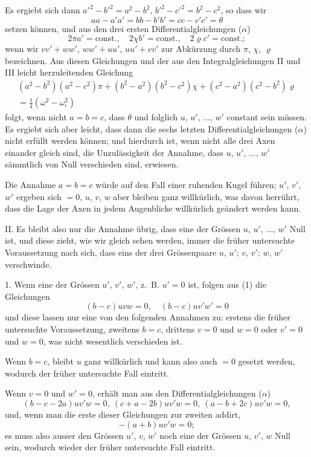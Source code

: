 \documentclass[12pt,a4paper]{article}
\begin{document}
Es ergiebt sich dann $a'^2 - b'^2 = a^2 - b^2$, $b'^2 - c'^2 = b^2 - c^2$, so dass wir
\[ aa - a'a' = bb - b'b' = cc - c'c' = \theta \]
setzen können, und aus den drei ersten Differentialgleichungen ($\alpha$)
\[ 2\pi a' = \text{const.},\quad 2\chi b' = \text{const.},\quad 2\varrho c' = \text{const.}; \]
wenn wir $vv' + ww'$, $ww' + uu'$, $uu' + vv'$ zur Abkürzung durch $\pi$, $\chi$, $\varrho$ bezeichnen. Aus diesen Gleichungen und der aus den Integralgleichungen II und III leicht herzuleitenden Gleichung
\begin{multline*}
(a^2-b^2)(a^2-c^2)\pi + (b^2-a^2)(b^2-c^2)\chi + (c^2-a^2)(c^2-b^2)\varrho\\
= \tfrac{1}{4}(\omega^2 - \omega_\iota^2)
\end{multline*}
folgt, wenn nicht $a = b = c$, dass $\theta$ und folglich $u$, $u'$, $\ldots$, $w'$ constant sein müssen. Es ergiebt sich aber leicht, dass dann die sechs letzten Differentialgleichungen ($\alpha$) nicht erfüllt werden können; und hierdurch ist, wenn nicht alle drei Axen einander gleich sind, die Unzulässigkeit der Annahme, dass $u$, $u'$, $\ldots$, $w'$ sämmtlich von Null verschieden sind, erwiesen.

Die Annahme $a = b = c$ würde auf den Fall einer ruhenden Kugel führen; $u'$, $v'$, $w'$ ergeben sich $= 0$, $u$, $v$, $w$ aber bleiben ganz willkürlich, was davon herrührt, dass die Lage der Axen in jedem Augenblicke willkürlich geändert werden kann.

II. Es bleibt also nur die Annahme übrig, dass eine der Grössen $u$, $u'$, $\ldots$, $w'$ Null ist, und diese zieht, wie wir gleich sehen werden, immer die früher untersuchte Voraussetzung nach sich, dass eins der drei Grössenpaare $u$, $u'$; $v$, $v'$; $w$, $w'$ verschwinde.

1. Wenn eine der Grössen $u'$, $v'$, $w'$, z.~B. $u' = 0$ ist, folgen aus (1) die Gleichungen
\[ (b-c)uvw = 0,\quad (b-c)uv'w' = 0 \]
und diese lassen nur eine von den folgenden Annahmen zu: erstens die früher untersuchte Voraussetzung, zweitens $b = c$, drittens $v = 0$ und $w = 0$ oder $v' = 0$ und $w = 0$, was nicht wesentlich verschieden ist.

Wenn $b = c$, bleibt $u$ ganz willkürlich und kann also auch $= 0$ gesetzt werden, wodurch der früher untersuchte Fall eintritt.

Wenn $v = 0$ und $w' = 0$, erhält man aus den Differentialgleichungen ($\alpha$)
\[ (b-c-2a)uv'w = 0,\ (c+a-2b)uv'w = 0,\ (a-b+2c)uv'w = 0, \]
und, wenn man die erste dieser Gleichungen zur zweiten addirt,
\[ -(a+b)uv'w = 0; \]
es muss also ausser den Grössen $u'$, $v$, $w'$ noch eine der Grössen $u$, $v'$, $w$ Null sein, wodurch wieder der früher untersuchte Fall eintritt.
\end{document}
